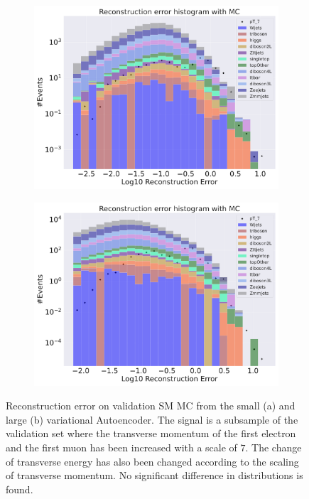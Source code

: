 \begin{figure}[H]
    \centering
    \begin{subfigure}{.45\textwidth}
        \includegraphics[width=\textwidth]{Figures/VAE_testing/small/b_data_recon_big_rm3_feats_sig_pT_7.pdf}
        \caption{}
        \label{fig:VAE_small_pt_7}
    \end{subfigure}
    \hfill 
    \begin{subfigure}{.45\textwidth}
        \includegraphics[width=\textwidth]{Figures/VAE_testing/big/b_data_recon_big_rm3_feats_sig_pT_7.pdf}
        \caption{ }
        \label{fig:VAE_big_pt_7}
    \end{subfigure}
    \hfill 
    \caption[VAE | Reconstruction error $p_T$ altering of 7]{Reconstruction error on validation SM MC from the small (a) and large (b) variational Autoencoder. The signal is a subsample of the validation 
    set where the transverse momentum of the first electron and the first muon has been increased with a scale of $7$. The change of transverse 
    energy has also been changed according to the scaling of transverse momentum. No significant difference in distributions is found.  }
    \label{fig:VAE_big_small_pt_7}
\end{figure}

